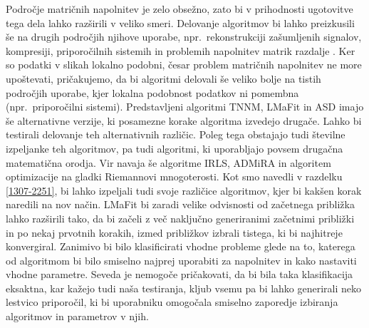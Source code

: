 Področje matričnih napolnitev je zelo obsežno, zato bi v prihodnosti ugotovitve tega dela lahko razširili v veliko smeri.
Delovanje algoritmov bi lahko preizkusili še na drugih področjih njihove uporabe, npr.\ rekonstrukciji zašumljenih signalov, kompresiji, priporočilnih sistemih in problemih napolnitev matrik razdalje \cite{Survey-NKS19}.
Ker so podatki v slikah lokalno podobni, česar problem matričnih napolnitev ne more upoštevati, pričakujemo, da bi algoritmi delovali še veliko bolje na tistih področjih uporabe, kjer lokalna podobnost podatkov ni pomembna (npr.\ priporočilni sistemi).
Predstavljeni algoritmi TNNM, LMaFit in ASD imajo še alternativne verzije, ki posamezne korake algoritma izvedejo drugače. Lahko bi testirali delovanje teh alternativnih različic. Poleg tega obstajajo tudi številne izpeljanke teh algoritmov,
pa tudi algoritmi, ki uporabljajo povsem drugačna matematična orodja. Vir \cite{Survey-NKS19} navaja še algoritme IRLS, ADMiRA in algoritem optimizacije na gladki Riemannovi mnogoterosti. Kot smo navedli v razdelku \ref{1307-2251}, bi lahko izpeljali tudi svoje različice algoritmov, kjer bi kakšen korak naredili na nov način. LMaFit bi zaradi velike odvisnosti od začetnega približka lahko razširili tako, da bi začeli z več naključno generiranimi začetnimi približki in po nekaj prvotnih korakih, izmed približkov izbrali tistega, ki bi najhitreje konvergiral. Zanimivo bi bilo klasificirati vhodne probleme glede na to, katerega od algoritmom bi bilo smiselno najprej uporabiti za napolnitev in kako nastaviti vhodne parametre. Seveda je nemogoče pričakovati, da bi bila taka klasifikacija eksaktna, kar kažejo tudi naša testiranja, kljub vsemu pa bi lahko generirali neko lestvico priporočil, ki bi uporabniku omogočala smiselno zaporedje izbiranja algoritmov in parametrov v njih.